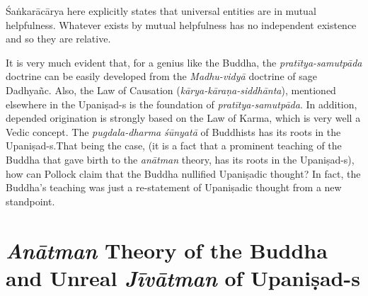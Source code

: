 Śaṅkarācārya here explicitly states that universal entities are in mutual helpfulness. Whatever exists by mutual helpfulness has no independent existence and so they are relative.

It is very much evident that, for a genius like the Buddha, the \textit{pratītya-samutpāda} doctrine can be easily developed from the \textit{Madhu-vidyā} doctrine of sage Dadhyañc. Also, the Law of Causation (\textit{kārya-kāraṇa-siddhānta}), mentioned elsewhere in the Upaniṣad-s is the foundation of \textit{pratītya-samutpāda}. In addition, depended origination is strongly based on the Law of Karma, which is very well a Vedic concept. The \textit{pugdala-dharma} \textit{śūnyatā} of Buddhists has its roots in the Upaniṣad-s.\break That being the case, (it is a fact that a prominent teaching of the Buddha that gave birth to the \textit{anātman} theory, has its roots in the Upaniṣad-s), how can Pollock claim that the Buddha nullified Upaniṣadic thought? In fact, the Buddha’s teaching was just a re-statement of Upaniṣadic thought from a new standpoint.

\vspace{-.3cm}

\section*{\textit{Anātman} Theory of the Buddha \hfill\break and Unreal \textit{Jīvātman} of Upaniṣad-s}

